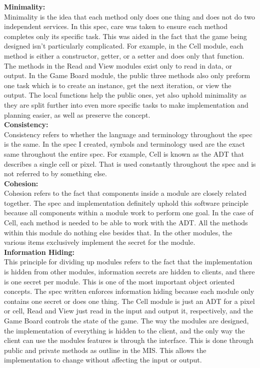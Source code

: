 \documentclass[12pt]{article}
\begin{document}
\noindent
\textbf{Minimality:} \\
Minimality is the idea that each method only does one thing and does not do two independent services. In this spec, care was taken to ensure each method completes only its specific task. This was aided in the fact that the game being designed isn't particularly complicated. For example, in the Cell module, each method is either a constructor, getter, or a setter and does only that function. The methods in the Read and View modules exist only to read in data, or output. In the Game Board module, the public three methods also only preform one task which is to create an instance, get the next iteration, or view the output. The local functions help the public ones, yet also uphold minimality as they are split further into even more specific tasks to make implementation and planning easier, as well as preserve the concept.\\

\noindent
\textbf{Consistency:} \\
Consistency refers to whether the language and terminology throughout the spec is the same. In the spec I created, symbols and terminology used are the exact same throughout the entire spec. For example, Cell is known as the ADT that describes a single cell or pixel. That is used constantly throughout the spec and is not referred to by something else.\\

\noindent
\textbf{Cohesion:} \\
Cohesion refers to the fact that components inside a module are closely related together. The spec and implementation definitely uphold this software principle because all components within a module work to perform one goal. In the case of Cell, each method is needed to be able to work with the ADT. All the methods within this module do nothing else besides that. In the other modules, the various items exclusively implement the secret for the module.\\

\noindent
\textbf{Information Hiding:} \\
This principle for dividing up modules refers to the fact that the implementation is hidden from other modules, information secrets are hidden to clients, and there is one secret per module. This is one of the most important object oriented concepts. The spec written enforces information hiding because each module only contains one secret or does one thing. The Cell module is just an ADT for a pixel or cell, Read and View just read in the input and output it, respectively, and the Game Board controls the state of the game. The way the modules are designed, the implementation of everything is hidden to the client, and the only way the client can use the modules features is through the interface. This is done through public and private methods as outline in the MIS. This allows the implementation to change without affecting the input or output. \\
\end{document}
